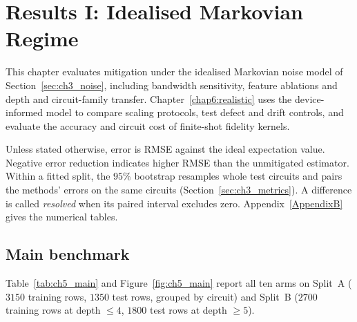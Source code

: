 \documentclass[Thesis.tex]{subfiles}
\begin{document}
\setcounter{chapter}{4} %



\chapter{Results I: Idealised Markovian Regime}\label{chap5:results}

This chapter evaluates mitigation under the idealised Markovian noise model of
Section~\ref{sec:ch3_noise}, including bandwidth sensitivity, feature ablations
and depth and circuit-family transfer. Chapter~\ref{chap6:realistic} uses the
device-informed model to compare scaling protocols, test defect and drift
controls, and evaluate the accuracy and circuit cost of finite-shot fidelity
kernels.

Unless stated otherwise, error is RMSE against the ideal expectation value.
Negative error reduction indicates higher RMSE than the unmitigated estimator.
Within a fitted split, the $95\%$ bootstrap resamples whole test circuits and
pairs the methods' errors on the same circuits (Section~\ref{sec:ch3_metrics}).
A difference is called \emph{resolved} when its paired interval excludes zero.
Appendix~\ref{AppendixB} gives the numerical tables.

\section{Main benchmark}\label{sec:ch5_main}

Table~\ref{tab:ch5_main} and Figure~\ref{fig:ch5_main} report all ten arms on
Split~A ($3150$ training rows, $1350$ test rows, grouped by circuit) and Split~B
($2700$ training rows at depth $\leq 4$, $1800$ test rows at depth $\geq 5$).
\end{document}
